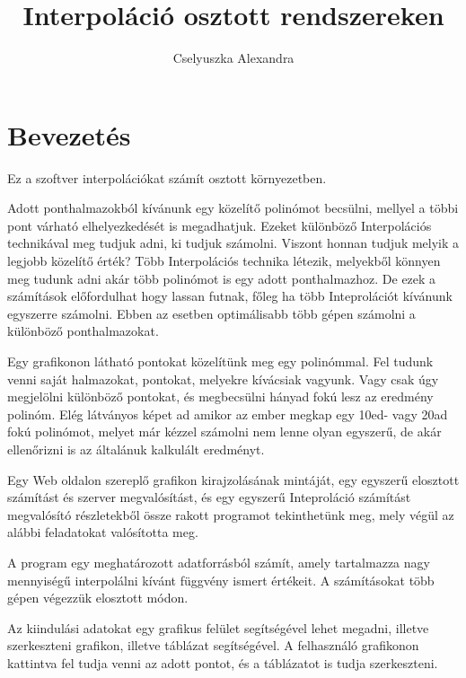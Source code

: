 \documentclass{elteikthesis}
\title{Interpoláció osztott rendszereken}
\author{Cselyuszka Alexandra}
\begin{document}
\frontmatter

	\maketitle
	\tableofcontents
	
\mainmatter

\chapter{Bevezetés} 


Ez a szoftver interpolációkat számít osztott környezetben.

Adott ponthalmazokból kívánunk egy közelítő polinómot becsülni, mellyel a többi pont várható elhelyezkedését is megadhatjuk. Ezeket különböző Interpolációs technikával meg tudjuk adni, ki tudjuk számolni. Viszont honnan tudjuk melyik a legjobb közelítő érték? Több Interpolációs technika létezik, melyekből könnyen meg tudunk adni akár több polinómot is egy adott ponthalmazhoz. De ezek a számítások előfordulhat hogy lassan futnak, főleg ha több Inteprolációt kívánunk egyszerre számolni. 
Ebben az esetben optimálisabb több gépen számolni a különböző ponthalmazokat.

Egy grafikonon látható pontokat közelítünk meg egy polinómmal.
Fel tudunk venni saját halmazokat, pontokat, melyekre kívácsiak vagyunk. Vagy csak úgy megjelölni különböző pontokat, és megbecsülni hányad fokú lesz az eredmény polinóm. Elég látványos képet ad amikor az ember megkap egy 10ed- vagy 20ad fokú polinómot, melyet már kézzel számolni nem lenne olyan egyszerű, de akár ellenőrizni is az általánuk kalkulált eredményt.

Egy Web oldalon szereplő grafikon kirajzolásának mintáját, egy egyszerű elosztott számítást és szerver megvalósítást, és egy egyszerű Inteproláció számítást megvalósító részletekből össze rakott programot tekinthetünk meg, mely végül az alábbi feladatokat valósította meg.

A program egy meghatározott adatforrásból számít, amely tartalmazza nagy mennyiségű interpolálni kívánt függvény ismert értékeit. A számításokat több gépen végezzük elosztott módon.  

Az kiindulási adatokat egy grafikus felület segítségével lehet megadni, illetve szerkeszteni grafikon, illetve táblázat segítségével. A felhasználó grafikonon kattintva fel tudja venni az adott pontot, és a táblázatot is tudja szerkeszteni.
\end{document}
